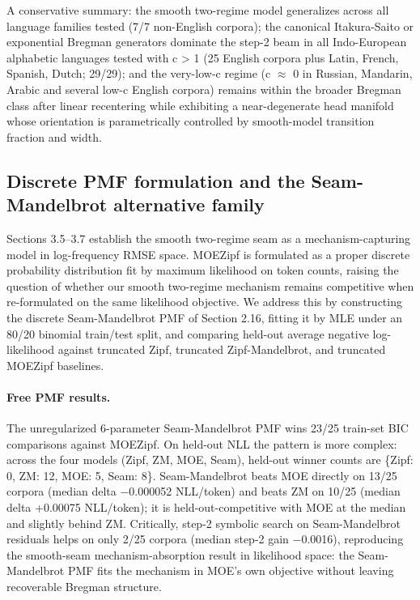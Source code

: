 \documentclass[11pt]{article}
\begin{document}
A conservative summary: the smooth two-regime model generalizes across all language families tested (7/7 non-English corpora); the canonical Itakura-Saito or exponential Bregman generators dominate the step-2 beam in all Indo-European alphabetic languages tested with c > 1 (25 English corpora plus Latin, French, Spanish, Dutch; 29/29); and the very-low-c regime (c $\approx$ 0 in Russian, Mandarin, Arabic and several low-c English corpora) remains within the broader Bregman class after linear recentering while exhibiting a near-degenerate head manifold whose orientation is parametrically controlled by smooth-model transition fraction and width.



\subsection{Discrete PMF formulation and the Seam-Mandelbrot alternative family}\label{sec:3-11-pmf}

Sections 3.5–3.7 establish the smooth two-regime seam as a mechanism-capturing model in log-frequency RMSE space. MOEZipf is formulated as a proper discrete probability distribution fit by maximum likelihood on token counts, raising the question of whether our smooth two-regime mechanism remains competitive when re-formulated on the same likelihood objective. We address this by constructing the discrete Seam-Mandelbrot PMF of Section 2.16, fitting it by MLE under an 80/20 binomial train/test split, and comparing held-out average negative log-likelihood against truncated Zipf, truncated Zipf-Mandelbrot, and truncated MOEZipf baselines.

\paragraph{Free PMF results.} The unregularized 6-parameter Seam-Mandelbrot PMF wins 23/25 train-set BIC comparisons against MOEZipf. On held-out NLL the pattern is more complex: across the four models (Zipf, ZM, MOE, Seam), held-out winner counts are \{Zipf: 0, ZM: 12, MOE: 5, Seam: 8\}. Seam-Mandelbrot beats MOE directly on 13/25 corpora (median delta −0.000052 NLL/token) and beats ZM on 10/25 (median delta +0.00075 NLL/token); it is held-out-competitive with MOE at the median and slightly behind ZM. Critically, step-2 symbolic search on Seam-Mandelbrot residuals helps on only 2/25 corpora (median step-2 gain −0.0016), reproducing the smooth-seam mechanism-absorption result in likelihood space: the Seam-Mandelbrot PMF fits the mechanism in MOE's own objective without leaving recoverable Bregman structure.
\end{document}
